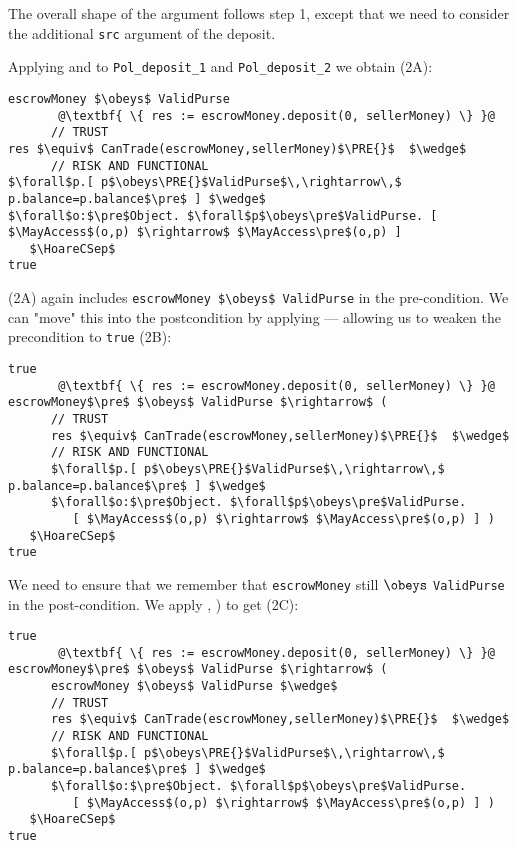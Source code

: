 The overall shape of the argument follows step 1, except that we need
to consider the additional \lstinline+src+ argument of the deposit.

Applying  and 
to \lstinline+Pol_deposit_1+ and \lstinline+Pol_deposit_2+
we obtain (2A):

\begin{lstlisting}[escapechar=@]
escrowMoney $\obeys$ ValidPurse
       @\textbf{ \{ res := escrowMoney.deposit(0, sellerMoney) \} }@
      // TRUST
res $\equiv$ CanTrade(escrowMoney,sellerMoney)$\PRE{}$  $\wedge$
      // RISK AND FUNCTIONAL
$\forall$p.[ p$\obeys\PRE{}$ValidPurse$\,\rightarrow\,$ p.balance=p.balance$\pre$ ] $\wedge$
$\forall$o:$\pre$Object. $\forall$p$\obeys\pre$ValidPurse. [ $\MayAccess$(o,p) $\rightarrow$ $\MayAccess\pre$(o,p) ]
   $\HoareCSep$
true
\end{lstlisting}

\noindent (2A) again includes \lstinline+escrowMoney $\obeys$ ValidPurse+ in
the pre-condition.  We can "move" this into the postcondition by
applying  ---  allowing us to weaken the precondition
to \lstinline+true+ (2B):

\begin{lstlisting}[escapechar=@]
true
       @\textbf{ \{ res := escrowMoney.deposit(0, sellerMoney) \} }@
escrowMoney$\pre$ $\obeys$ ValidPurse $\rightarrow$ (
      // TRUST
      res $\equiv$ CanTrade(escrowMoney,sellerMoney)$\PRE{}$  $\wedge$
      // RISK AND FUNCTIONAL
      $\forall$p.[ p$\obeys\PRE{}$ValidPurse$\,\rightarrow\,$ p.balance=p.balance$\pre$ ] $\wedge$
      $\forall$o:$\pre$Object. $\forall$p$\obeys\pre$ValidPurse.
         [ $\MayAccess$(o,p) $\rightarrow$ $\MayAccess\pre$(o,p) ] )
   $\HoareCSep$
true
\end{lstlisting}

We need to ensure that we remember that \lstinline+escrowMoney+ still $\obeys$
\texttt{ValidPurse} in the post-condition. We apply
, ) to get (2C):

\begin{lstlisting}[escapechar=@]
true
       @\textbf{ \{ res := escrowMoney.deposit(0, sellerMoney) \} }@
escrowMoney$\pre$ $\obeys$ ValidPurse $\rightarrow$ (
      escrowMoney $\obeys$ ValidPurse $\wedge$
      // TRUST
      res $\equiv$ CanTrade(escrowMoney,sellerMoney)$\PRE{}$  $\wedge$
      // RISK AND FUNCTIONAL
      $\forall$p.[ p$\obeys\PRE{}$ValidPurse$\,\rightarrow\,$ p.balance=p.balance$\pre$ ] $\wedge$
      $\forall$o:$\pre$Object. $\forall$p$\obeys\pre$ValidPurse.
         [ $\MayAccess$(o,p) $\rightarrow$ $\MayAccess\pre$(o,p) ] )
   $\HoareCSep$
true
\end{lstlisting}


